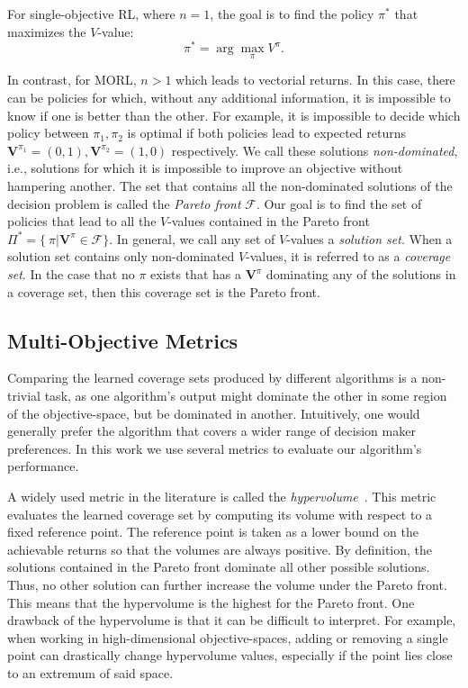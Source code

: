 \documentclass{article}
\renewcommand{\cite}[1]{\citep{#1}}
\newcommand{\mdppolicy}{\pi}
\newcommand{\mdpvaluefunction}{V}
\newcommand{\momdpvaluefunction}{\mathbf{V}}
\begin{document}
For single-objective RL, where $n = 1$, the goal is to find the policy $\mdppolicy^{*}$ that maximizes the $\mdpvaluefunction$-value:
\begin{equation}
\mdppolicy^*= \arg\max_\mdppolicy \mdpvaluefunction^\mdppolicy.
\end{equation}

In contrast, for MORL, $n > 1$ which leads to vectorial returns. In this case, there can be policies for which, without any additional information, it is impossible to know if one is better than the other. For example, it is impossible to decide which policy between $\mdppolicy_1, \mdppolicy_2$ is optimal if both policies lead to expected returns $\momdpvaluefunction^{\mdppolicy_1}=(0,1), \momdpvaluefunction^{\mdppolicy_2}=(1,0)$ respectively. We call these solutions \emph{non-dominated}, i.e., solutions for which it is impossible to improve an objective without hampering another. The set that contains all the non-dominated solutions of the decision problem is called the \emph{Pareto front} $\mathcal{F}$. Our goal is to find the set of policies that lead to all the $\mdpvaluefunction$-values contained in the Pareto front $\Pi^* = \{\ \pi | \momdpvaluefunction^{\pi} \in \mathcal{F}\}$. In general, we call any set of $\mdpvaluefunction$-values a \emph{solution set}. When a solution set contains only  non-dominated $\mdpvaluefunction$-values, it is referred to as a \emph{coverage set}. In the case that no $\mdppolicy$ exists that has a $\momdpvaluefunction^{\pi}$ dominating any of the solutions in a coverage set, then this coverage set is the Pareto front.

\subsection{Multi-Objective Metrics}
Comparing the learned coverage sets produced by different algorithms is a non-trivial task, as one algorithm's output might dominate the other in some region of the objective-space, but be dominated in another. Intuitively, one would generally prefer the algorithm that covers a wider range of decision maker preferences. In this work we use several metrics to evaluate our algorithm's performance.

A widely used metric in the literature is called the \emph{hypervolume}~\cite{zitzler2003}. This metric evaluates the learned coverage set by computing its volume with respect to a fixed reference point. The reference point is taken as a lower bound on the achievable returns so that the volumes are always positive. By definition, the solutions contained in the Pareto front dominate all other possible solutions. Thus, no other solution can further increase the volume under the Pareto front. This means that the hypervolume is the highest for the Pareto front. One drawback of the hypervolume is that it can be difficult to interpret. For example, when working in high-dimensional objective-spaces, adding or removing a single point can drastically change hypervolume values, especially if the point lies close to an extremum of said space.
\end{document}
